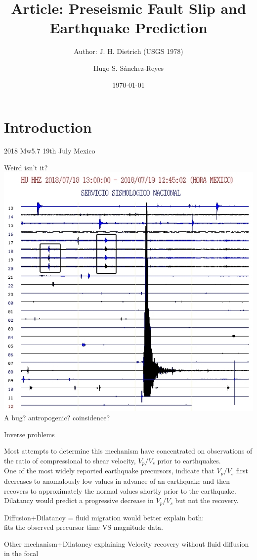 \documentclass[aspectratio=43,9pt]{beamer}
\title{Article: Preseismic Fault Slip and Earthquake Prediction}								%
\subtitle{Author: J. H. Dietrich (USGS 1978)}					%
\date{\today}
\author{Hugo S. S\'anchez-Reyes}								%
\institute{ISTerre, Universit\'e Grenoble Alpes}							%
\begin{document}
\maketitle



\section{Introduction}

\begin{frame}{2018 Mw5.7 19th July Mexico}

  \centering \large Weird isn't it?\\
  \vskip 0.5cm
  \includegraphics[width=0.55\linewidth]{Figs/weird.jpg}
  \vskip 0.05cm
  A bug? antropogenic? coinsidence?

\end{frame}



\begin{frame}{Inverse problems}

Most attempts to determine this mechanism have concentrated 
on observations of the ratio of compressional to shear velocity, $V_p/V_s$ 
prior to earthquakes.\\
\vskip 0.5cm
One of the most widely reported earthquake precursors, indicate that 
$V_p/V_s$ first decreases to anomalously low values in advance of 
an earthquake and then recovers to approximately the normal values 
shortly prior to the earthquake.\\
\vskip 0.5cm
Dilatancy would predict a progressive decrease in $V_p/V_s$ but not the recovery.\\
\vskip 0.5cm
\begin{minipage}{0.45\linewidth}
Diffusion+Dilatancy = fluid migration would better explain both: \\
fits the observed precursor time VS magnitude data.
\end{minipage}\quad
\begin{minipage}{0.45\linewidth}
Other mechanism+Dilatancy explaining Velocity recovery without fluid diffusion in the focal
\end{minipage}

\end{frame}
\end{document}
